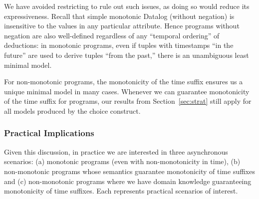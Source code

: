 We have avoided restricting \lang to rule out such issues, as doing so
would reduce its expressiveness.  Recall that simple monotonic Datalog (without negation) is insensitive to the values in any particular attribute.  Hence \lang programs without negation are also well-defined regardless of any ``temporal ordering'' of deductions: in monotonic programs, even if tuples with timestamps ``in the future'' are used to derive tuples ``from the past,'' there is an unambiguous least minimal model.

For non-monotonic \slang programs, the monotonicity of the time suffix ensures us a unique minimal model in many cases.  Whenever we can guarantee monotonicity of the time suffix for \lang programs, our results from Section~\ref{sec:strat} still apply for all models produced by the choice construct.


%

% 
\subsubsection{Practical Implications}
Given this discussion, in practice we are interested in three asynchronous scenarios: (a) monotonic programs (even with non-monotonicity in time), (b) non-monotonic programs whose semantics guarantee monotonicity of time suffixes  and (c) non-monotonic programs where we have domain knowledge guaranteeing monotonicity of time suffixes.  Each represents practical scenarios of interest.

